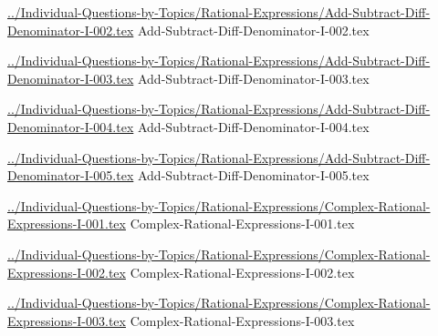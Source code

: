 \documentclass[answer,cancelspace,12pt]{exam}
\begin{document}
\begin{questions}
\question
\href{../Individual-Questions-by-Topics/Rational-Expressions/Add-Subtract-Diff-Denominator-I-002.tex}{../Individual-Questions-by-Topics/Rational-Expressions/Add-Subtract-Diff-Denominator-I-002.tex}
{Add-Subtract-Diff-Denominator-I-002.tex}


\question
\href{../Individual-Questions-by-Topics/Rational-Expressions/Add-Subtract-Diff-Denominator-I-003.tex}{../Individual-Questions-by-Topics/Rational-Expressions/Add-Subtract-Diff-Denominator-I-003.tex}
{Add-Subtract-Diff-Denominator-I-003.tex}



\question
\href{../Individual-Questions-by-Topics/Rational-Expressions/Add-Subtract-Diff-Denominator-I-004.tex}{../Individual-Questions-by-Topics/Rational-Expressions/Add-Subtract-Diff-Denominator-I-004.tex}
{Add-Subtract-Diff-Denominator-I-004.tex}


\question
\href{../Individual-Questions-by-Topics/Rational-Expressions/Add-Subtract-Diff-Denominator-I-005.tex}{../Individual-Questions-by-Topics/Rational-Expressions/Add-Subtract-Diff-Denominator-I-005.tex}
{Add-Subtract-Diff-Denominator-I-005.tex}


\question
\href{../Individual-Questions-by-Topics/Rational-Expressions/Complex-Rational-Expressions-I-001.tex}{../Individual-Questions-by-Topics/Rational-Expressions/Complex-Rational-Expressions-I-001.tex}
{Complex-Rational-Expressions-I-001.tex}


\question
\href{../Individual-Questions-by-Topics/Rational-Expressions/Complex-Rational-Expressions-I-002.tex}{../Individual-Questions-by-Topics/Rational-Expressions/Complex-Rational-Expressions-I-002.tex}
{Complex-Rational-Expressions-I-002.tex}

\question
\href{../Individual-Questions-by-Topics/Rational-Expressions/Complex-Rational-Expressions-I-003.tex}{../Individual-Questions-by-Topics/Rational-Expressions/Complex-Rational-Expressions-I-003.tex}
{Complex-Rational-Expressions-I-003.tex}



\end{questions}
\end{document}
